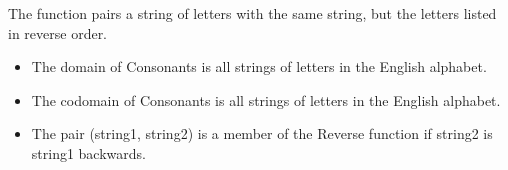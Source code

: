\documentclass{ximera}
\begin{document}
\begin{definition}
  The function  pairs a string of letters with the same string, but the letters listed in reverse order.
 
    \begin{itemize}
    \item The domain of Consonants is all strings of letters in the English alphabet.
    \item The codomain of Consonants is all strings of letters in the English alphabet.
    \item The pair (string1, string2) is a member of the Reverse function if string2 is string1 backwards.
    \end{itemize}

  
\end{definition}
\end{document}
